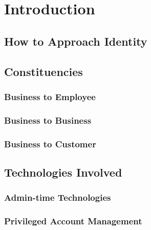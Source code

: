 \hypertarget{introduction}{%
\chapter{Introduction}\label{introduction}}

\hypertarget{how-to-approach-identity}{%
\section{How to Approach Identity}\label{how-to-approach-identity}}

\hypertarget{constituencies}{%
\section{Constituencies}\label{constituencies}}

\hypertarget{business-to-employee}{%
\subsection{Business to Employee}\label{business-to-employee}}

\hypertarget{business-to-business}{%
\subsection{Business to Business}\label{business-to-business}}

\hypertarget{business-to-customer}{%
\subsection{Business to Customer}\label{business-to-customer}}

\hypertarget{technologies-involved}{%
\section{Technologies Involved}\label{technologies-involved}}

\hypertarget{admin-time-technologies}{%
\subsection{Admin-time Technologies}\label{admin-time-technologies}}

\hypertarget{privileged-account-management}{%
\subsection{Privileged Account
Management}\label{privileged-account-management}}

